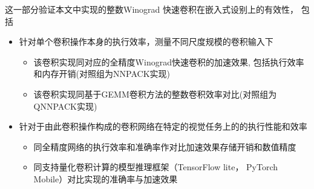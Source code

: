 这一部分验证本文中实现的整数Winograd 快速卷积在嵌入式设别上的有效性，
包括
\begin{itemize}
  \item 针对单个卷积操作本身的执行效率，测量不同尺度规模的卷积输入下
    \begin{itemize}
        \item 该卷积实现同对应的全精度Winograd快速卷积的加速效果, 包括执行效率和内存开销(对照组为NNPACK实现)
        \item 该卷积实现同基于GEMM卷积方法的整数卷积效率对比(对照组为QNNPACK实现)
    \end{itemize}
  \item 针对于由此卷积操作构成的卷积网络在特定的视觉任务上的的执行性能和效率
    \begin{itemize}
        \item 同全精度网络的执行效率和准确率作对比加速效果存储开销和数值精度
        \item 同支持量化卷积计算的模型推理框架（TensorFlow lite， PyTorch Mobile）对比实现的准确率与加速效果
    \end{itemize}

\end{itemize}
